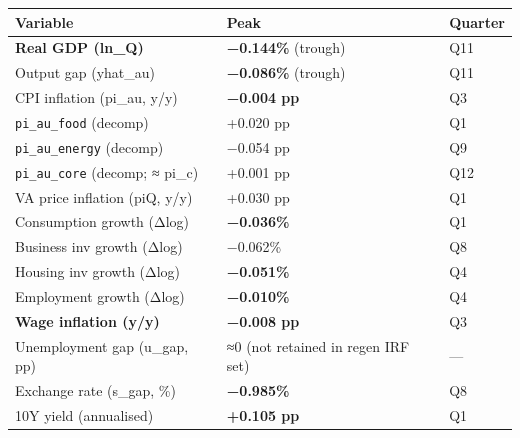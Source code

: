 \documentclass[
]{article}
\newcounter{none} %
\begin{document}
{\def\LTcaptype{none} %
\begin{longtable}[]{@{}
  >{\raggedright\arraybackslash}p{}
  >{\raggedright\arraybackslash}p{}
  >{\raggedright\arraybackslash}p{}@{}}
\toprule\noalign{}
\begin{minipage}[b]{\linewidth}\raggedright
Variable
\end{minipage} & \begin{minipage}[b]{\linewidth}\raggedright
Peak
\end{minipage} & \begin{minipage}[b]{\linewidth}\raggedright
Quarter
\end{minipage} \\
\midrule\noalign{}
\endhead
\bottomrule\noalign{}
\endlastfoot
\textbf{Real GDP (ln\_Q)} & \textbf{−0.144\%} (trough) & Q11 \\
Output gap (yhat\_au) & \textbf{−0.086\%} (trough) & Q11 \\
CPI inflation (pi\_au, y/y) & \textbf{−0.004 pp} & Q3 \\
\texttt{pi\_au\_food} (decomp) & +0.020 pp & Q1 \\
\texttt{pi\_au\_energy} (decomp) & −0.054 pp & Q9 \\
\texttt{pi\_au\_core} (decomp; ≈ pi\_c) & +0.001 pp & Q12 \\
VA price inflation (piQ, y/y) & +0.030 pp & Q1 \\
Consumption growth (Δlog) & \textbf{−0.036\%} & Q1 \\
Business inv growth (Δlog) & −0.062\% & Q8 \\
Housing inv growth (Δlog) & \textbf{−0.051\%} & Q4 \\
Employment growth (Δlog) & \textbf{−0.010\%} & Q4 \\
\textbf{Wage inflation (y/y)} & \textbf{−0.008 pp} & Q3 \\
Unemployment gap (u\_gap, pp) & ≈0 (not retained in regen IRF set) &
--- \\
Exchange rate (s\_gap, \%) & \textbf{−0.985\%} & Q8 \\
10Y yield (annualised) & \textbf{+0.105 pp} & Q1 \\
\end{longtable}
}
\end{document}

